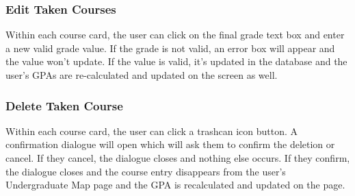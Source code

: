 \documentclass[12pt, a4paper]{article}
\begin{document}
\subsubsection*{Edit Taken Courses}
Within each course card, the user can click on the final grade text box and enter a new valid grade value. If the grade is not valid, an error box will appear and the value won't update. If the value is valid, it's updated in the database and the user's GPAs are re-calculated and updated on the screen as well.
\subsubsection*{Delete Taken Course}
Within each course card, the user can click a trashcan icon button. A confirmation dialogue will open which will ask them to confirm the deletion or cancel. If they cancel, the dialogue closes and nothing else occurs. If they confirm, the dialogue closes and the course entry disappears from the user's Undergraduate Map page and the GPA is recalculated and updated on the page.
\end{document}
